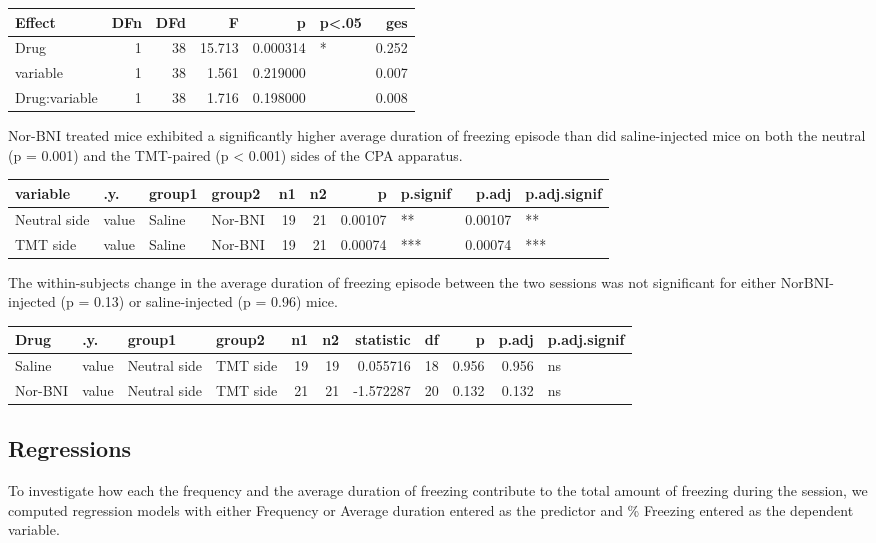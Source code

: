 \documentclass[
]{book}
\begin{document}
\begin{tabular}{l|r|r|r|r|l|r}
\hline
Effect & DFn & DFd & F & p & p<.05 & ges\\
\hline
Drug & 1 & 38 & 15.713 & 0.000314 & * & 0.252\\
\hline
variable & 1 & 38 & 1.561 & 0.219000 &  & 0.007\\
\hline
Drug:variable & 1 & 38 & 1.716 & 0.198000 &  & 0.008\\
\hline
\end{tabular}

Nor-BNI treated mice exhibited a significantly higher average duration of freezing episode than did saline-injected mice on both the neutral (p = 0.001) and the TMT-paired (p \textless{} 0.001) sides of the CPA apparatus.

\begin{tabular}{l|l|l|l|r|r|r|l|r|l}
\hline
variable & .y. & group1 & group2 & n1 & n2 & p & p.signif & p.adj & p.adj.signif\\
\hline
Neutral side & value & Saline & Nor-BNI & 19 & 21 & 0.00107 & ** & 0.00107 & **\\
\hline
TMT side & value & Saline & Nor-BNI & 19 & 21 & 0.00074 & *** & 0.00074 & ***\\
\hline
\end{tabular}

The within-subjects change in the average duration of freezing episode between the two sessions was not significant for either NorBNI-injected (p = 0.13) or saline-injected (p = 0.96) mice.

\begin{tabular}{l|l|l|l|r|r|r|r|r|r|l}
\hline
Drug & .y. & group1 & group2 & n1 & n2 & statistic & df & p & p.adj & p.adj.signif\\
\hline
Saline & value & Neutral side & TMT side & 19 & 19 & 0.055716 & 18 & 0.956 & 0.956 & ns\\
\hline
Nor-BNI & value & Neutral side & TMT side & 21 & 21 & -1.572287 & 20 & 0.132 & 0.132 & ns\\
\hline
\end{tabular}

\hypertarget{regressions-1}{%
\subsection{Regressions}\label{regressions-1}}

To investigate how each the frequency and the average duration of freezing contribute to the total amount of freezing during the session, we computed regression models with either Frequency or Average duration entered as the predictor and \% Freezing entered as the dependent variable.
\end{document}
